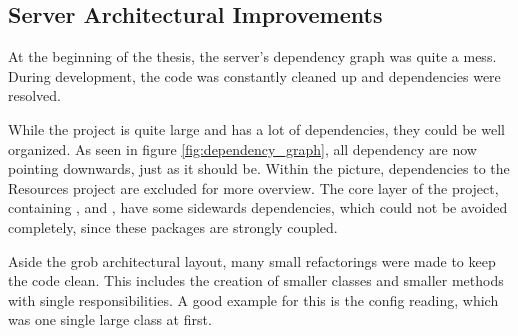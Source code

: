 \cite{sa}
\cite{mono-slack}
\cite{mono-git}


\subsection{Server Architectural Improvements}
At the beginning of the thesis, the server's dependency graph was quite a mess.
During development, the code was constantly cleaned up and dependencies were resolved.

While the project is quite large and has a lot of dependencies, they could be well organized.
As seen in figure \ref{fig:dependency_graph}, all dependency are now pointing downwards, just as it should be.
Within the picture, dependencies to the Resources project are excluded for more overview.
The core layer of the project, containing ,  and , have some sidewards dependencies, which could not be avoided completely, since these packages are strongly coupled.

Aside the grob architectural layout, many small refactorings were made to keep the code clean.
This includes the creation of smaller classes and smaller methods with single responsibilities.
A good example for this is the config reading, which was one single large class at first. 
